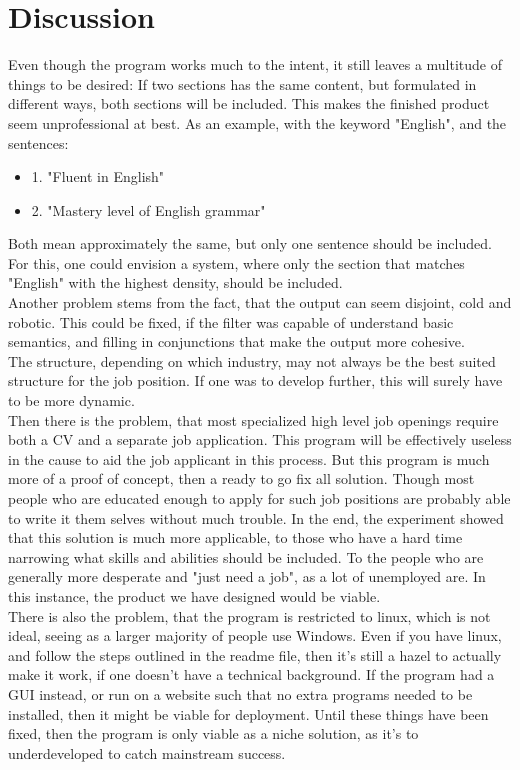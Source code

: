 \section{Discussion}\label{sec:discussion}
Even though the program works much to the intent, it still leaves a multitude of things to be desired:
If two sections has the same content, but formulated in different ways, both sections will be included.
This makes the finished product seem unprofessional at best. As an example, with the keyword "English", and the sentences:
\begin{itemize}
  \item 1. "Fluent in English"
  \item 2. "Mastery level of English grammar"
\end{itemize}
Both mean approximately the same, but only one sentence should be included. For this, one could envision a system, where only the section that matches "English" with the highest density, should be included.\\

Another problem stems from the fact, that the output can seem disjoint, cold and robotic. This could be fixed, if the filter was capable of understand basic semantics, and filling in conjunctions that make the output more cohesive.\\

The structure, depending on which industry, may not always be the best suited structure for the job position. If one was to develop further, this will surely have to be more dynamic.\\

Then there is the problem, that most specialized high level job openings require both a CV and a separate job application. This program will be effectively useless in the cause to aid the job applicant in this process.
But this program is much more of a proof of concept, then a ready to go fix all solution.
Though most people who are educated enough to apply for such job positions are probably able to write it them selves without much trouble.
In the end, the experiment showed that this solution is much more applicable, to those who have a hard time narrowing what skills and abilities should be included.
To the people who are generally more desperate and "just need a job", as a lot of unemployed are.
In this instance, the product we have designed would be viable.\\

There is also the problem, that the program is restricted to linux, which is not ideal, seeing as a larger majority of people use Windows.
Even if you have linux, and follow the steps outlined in the readme file, then it's still a hazel to actually make it work, if one doesn't have a technical background.
If the program had a GUI instead, or run on a website such that no extra programs needed to be installed, then it might be viable for deployment.
Until these things have been fixed, then the program is only viable as a niche solution, as it's to underdeveloped to catch mainstream success.

\clearpage
